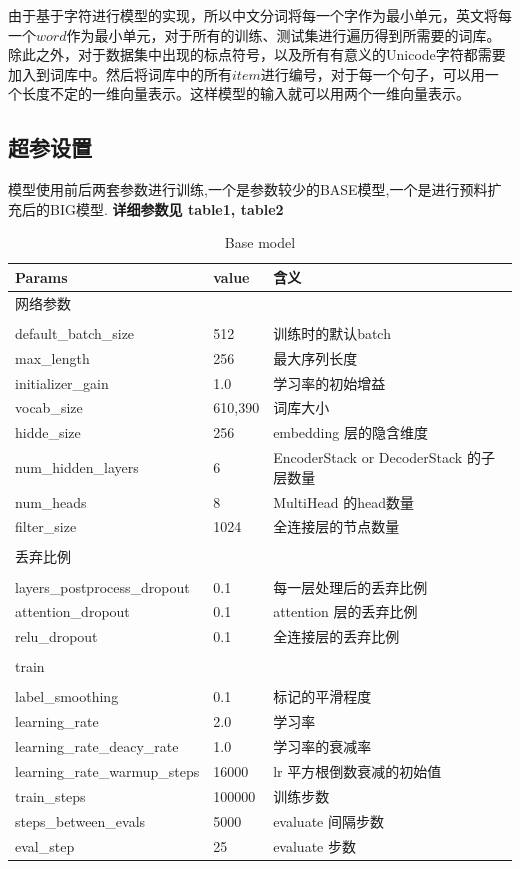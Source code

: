 \documentclass[UTF8,a4paper,10pt]{ctexart}
\begin{document}
   由于基于字符进行模型的实现，所以中文分词将每一个字作为最小单元，英文将每一个$word$作为最小单元，对于所有的训练、测试集进行遍历得到所需要的词库。除此之外，对于数据集中出现的标点符号，以及所有有意义的Unicode字符都需要加入到词库中。然后将词库中的所有$item$进行编号，对于每一个句子，可以用一个长度不定的一维向量表示。这样模型的输入就可以用两个一维向量表示。
\subsection{超参设置}
  模型使用前后两套参数进行训练,一个是参数较少的BASE模型,一个是进行预料扩充后的BIG模型.
  \textbf{详细参数见 table1, table2}
  
  \begin{table}[!h]  
    \caption{Base model}  
    \begin{tabularx}{18cm}{lXl}  
      \hline  
      Params & value  & 含义 \\  
    \hline  
    网络参数 \\ \\
    default\_batch\_size  & 512 & 训练时的默认batch \\  
    max\_length & 256 & 最大序列长度 \\
    initializer\_gain & 1.0 & 学习率的初始增益 \\
    vocab\_size & 610,390 & 词库大小 \\
    hidde\_size & 256 & embedding 层的隐含维度\\
    num\_hidden\_layers & 6 & EncoderStack or DecoderStack 的子层数量 \\
    num\_heads & 8 & MultiHead 的head数量 \\
    filter\_size & 1024 & 全连接层的节点数量 \\ 
    
    \\
    丢弃比例 \\ \\ 

    layers\_postprocess\_dropout & 0.1 & 每一层处理后的丢弃比例 \\
    attention\_dropout & 0.1 & attention 层的丢弃比例 \\
    relu\_dropout & 0.1 & 全连接层的丢弃比例 \\

    \\
    train \\  \\
    label\_smoothing & 0.1 & 标记的平滑程度 \\
    learning\_rate & 2.0 & 学习率 \\
    learning\_rate\_deacy\_rate & 1.0 & 学习率的衰减率 \\
    learning\_rate\_warmup\_steps & 16000 & lr 平方根倒数衰减的初始值 \\
    train\_steps & 100000 & 训练步数 \\
    steps\_between\_evals & 5000 & evaluate 间隔步数 \\
    eval\_step & 25 & evaluate 步数 \\ 
        

\end{tabularx}
\end{table}
\end{document}
